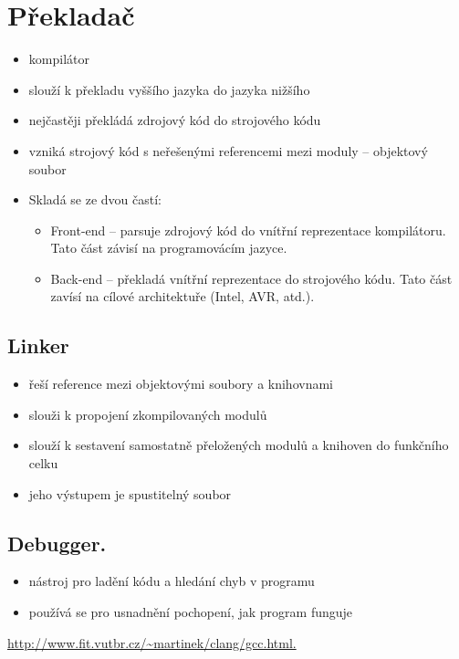 \documentclass{szzclass}
\begin{document}
\section{Překladač}
\begin{itemize}
\item kompilátor
\item slouží k překladu vyššího jazyka do jazyka nižšího
\item nejčastěji překládá zdrojový kód do strojového kódu
\item vzniká strojový kód s neřešenými referencemi mezi moduly – objektový soubor
\item Skladá se ze dvou častí:
  \begin{itemize}
    \item Front-end  – parsuje zdrojový kód do vnítřní reprezentace kompilátoru. Tato část závisí na programovácím jazyce.
    \item Back-end – překladá vnítřní reprezentace do strojového kódu. Tato část zavísí na cílové architektuře (Intel, AVR, atd.).
  \end{itemize}
\end{itemize}
\subsection{Linker}
\begin{itemize}
\item řeší reference mezi objektovými soubory a knihovnami
\item slouži k propojení zkompilovaných modulů
\item slouží k sestavení samostatně přeložených modulů a knihoven do funkčního celku
\item jeho výstupem je spustitelný soubor
\end{itemize}
\subsection{Debugger.}
\begin{itemize}
  \item nástroj pro ladění kódu a hledání chyb v programu
  \item používá se pro usnadnění pochopení, jak program funguje
\end{itemize}

\url{http://www.fit.vutbr.cz/~martinek/clang/gcc.html.}
\end{document}
